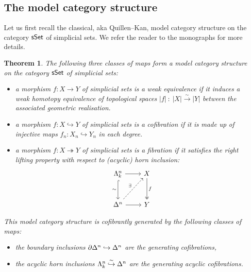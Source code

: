 \documentclass[twoside, 10pt]{amsart}
\newtheorem{theorem}[lemma]{Theorem}
\begin{document}
\subsection{The model category structure}

Let us first recall  the classical, aka Quillen--Kan, model category structure on the category $\sSe$ of simplicial sets. We refer the reader to the monographs \cite{Hovey99, GoerssJardine09} for more details. 

\begin{theorem}\cite{Quillen67}\label{thm:QuillenSet}
 The following three classes of maps form a model category structure on the category $\sSe$ of simplicial sets: 
\begin{itemize}
\item a morphism $f  :  X\to Y$ of simplicial sets is a \emph{weak equivalence} if it induces a weak homotopy equivalence of topological spaces $|f|\ :\ |X| \xrightarrow{\sim} |Y|$ between the associated geometric realisation.

\item a morphism $f  :  X\hookrightarrow Y$ of simplicial sets is a \emph{cofibration} if it is made up of injective maps 
$f_n  :  X_n\hookrightarrow Y_n$  
in each degree.

\item a morphism $f  :  X\twoheadrightarrow Y$ of simplicial sets is a \emph{fibration} if it satisfies the right lifting property with respect to  (acyclic) horn inclusion: 
\[
\vcenter{\hbox{
\begin{tikzcd}[column sep=0.8cm, row sep=1cm]
\Lambda^n_k 
\arrow[d, hookrightarrow, "\sim"']
\arrow[r]
& X \arrow[d, "f",twoheadrightarrow]
\\
\De{n} \arrow[ur, dashrightarrow, "\exists "] \arrow[r]
& Y
\end{tikzcd}
}}
\]
\end{itemize}
This model category structure is cofibrantly generated by the following classes of maps:
\begin{itemize}
\item the boundary inclusions $\partial \De{n} \hookrightarrow \De{n}$ are the generating cofibrations, 

\item the acyclic horn inclusions $\Ho{k}{n}  \stackrel{\sim}{\hookrightarrow} \De{n}$ are the generating acyclic cofibrations. 
\end{itemize}
\end{theorem}
\end{document}
